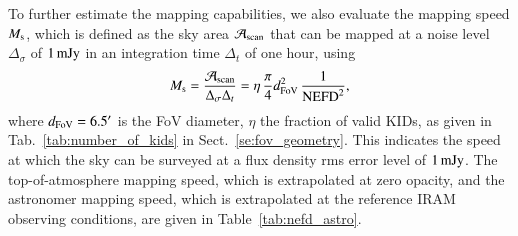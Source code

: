 To further estimate the mapping capabilities, we also evaluate the
mapping speed $M_{\rm{s}}$, which is defined as the sky area
$\mathcal{A}_{\rm{scan}}$ that can
be mapped at a noise level $\Delta_\sigma$ of $1\,\rm{mJy}$ in an
integration time $\Delta_t$ of one hour, using
\begin{equation}
M_{\rm{s}} = \frac{\mathcal{A}_{\rm{scan}}}{\Delta_\sigma\Delta_t} = \eta \, \frac{\pi}{4} d_{\rm{FoV}}^2 \, \frac{1}{\rm{NEFD}^2},
\end{equation}
where $d_{\rm{FoV}} = 6.5'$ is the FoV diameter, $\eta$ the
fraction of valid KIDs, as given in Tab.~\ref{tab:number_of_kids} in
Sect.~\ref{se:fov_geometry}. This indicates the speed at which the sky
can be surveyed at a flux density rms error level of $1\,\rm{mJy}$.
The top-of-atmosphere mapping speed, which is extrapolated at zero opacity, and the astronomer
mapping speed, which is extrapolated at the reference IRAM observing conditions, are
given in Table~\ref{tab:nefd_astro}.   

